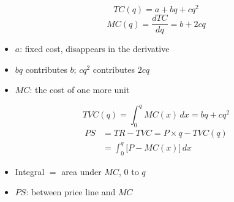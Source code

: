 
\begin{frame}[plain,label=w2_02_deriv]
  \Large
  \[
    \tag{5}\;TC(q) = a + bq + cq^2
  \]
  \[
    \tag{6}\;MC(q) = \frac{dTC}{dq} = b + 2cq
  \]

  \vspace{0.75em}
  \begin{itemize}\Large
    \item $a$: fixed cost, disappears in the derivative
    \item $bq$ contributes $b$; $cq^2$ contributes $2cq$
    \item $MC$: the cost of one more unit
  \end{itemize}
\end{frame}

\begin{frame}[plain,label=w2_03_integral]
  \Large
  \[
    \tag{7}\;TVC(q) = \int_0^{q} MC(x)\,dx = bq + cq^2
  \]
  \begin{align*}
    \tag{8}\;PS &= TR - TVC = P \times q - TVC(q)\\
                &= \int_0^{q} \bigl[P - MC(x)\bigr]\,dx
  \end{align*}

  \vspace{0.5em}
  \begin{itemize}\Large
    \item Integral $=$ area under $MC$, $0$ to $q$
    \item $PS$: between price line and $MC$
  \end{itemize}
\end{frame}

